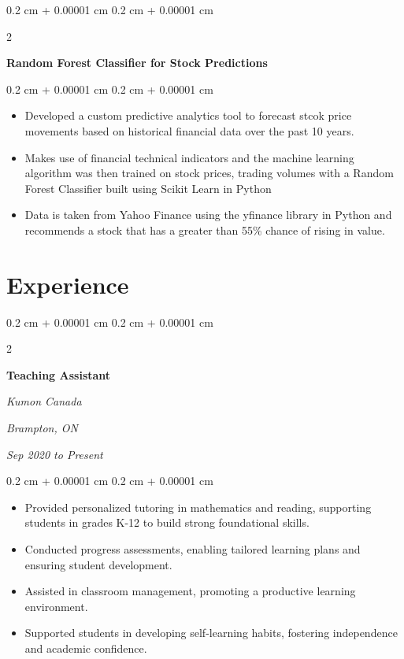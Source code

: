 \documentclass[10pt, letterpaper]{article}
\newenvironment{highlights}{
    \begin{itemize}[
        topsep=0.10 cm,
        parsep=0.10 cm,
        partopsep=0pt,
        itemsep=0pt,
        leftmargin=0.4 cm + 10pt
    ]
}{
    \end{itemize}
} %
\newenvironment{onecolentry}{
    \begin{adjustwidth}{
        0.2 cm + 0.00001 cm
    }{
        0.2 cm + 0.00001 cm
    }
}{
    \end{adjustwidth}
} %
\newenvironment{twocolentry}[2][]{
    \onecolentry
    \def\secondColumn{#2}
    \setcolumnwidth{\fill, 4.5 cm}
    \begin{paracol}{2}
}{
    \switchcolumn \raggedleft \secondColumn
    \end{paracol}
    \endonecolentry
} %
\let\hrefWithoutArrow\href
\renewcommand{\href}[2]{\hrefWithoutArrow{#1}{\ifthenelse{\equal{#2}{}}{ }{#2 }\raisebox{.15ex}{\footnotesize \faExternalLink*}}}
\begin{document}
        \vspace{0.2 cm}

        \begin{twocolentry}{
            
            
        \textit{\href{https://github.com/akramj13/ai-stock-predictor}{GitHub Link}}}
            \textbf{Random Forest Classifier for Stock Predictions}
        \end{twocolentry}

        \vspace{0.10 cm}
        \begin{onecolentry}
            \begin{highlights}
                \item Developed a custom predictive analytics tool to forecast stcok price movements based on historical financial data over the past 10 years.
                \item Makes use of financial technical indicators and the machine learning algorithm was then trained on stock prices, trading volumes with a Random Forest Classifier built using Scikit Learn in Python
                \item Data is taken from Yahoo Finance using the yfinance library in Python and recommends a stock that has a greater than 55\% chance of rising in value.
            \end{highlights}
        \end{onecolentry}



    
    \section{Experience}



        
        \begin{twocolentry}{
        \textit{Brampton, ON}    
            
        \textit{Sep 2020 to Present}}
            \textbf{Teaching Assistant}
            
            \textit{Kumon Canada}
        \end{twocolentry}

        \vspace{0.10 cm}
        \begin{onecolentry}
            \begin{highlights}
                \item Provided personalized tutoring in mathematics and reading, supporting students in grades K-12 to build strong foundational skills.
                \item Conducted progress assessments, enabling tailored learning plans and ensuring student development.
                \item Assisted in classroom management, promoting a productive learning environment.
                \item Supported students in developing self-learning habits, fostering independence and academic confidence.
            \end{highlights}
        \end{onecolentry}
\end{document}
